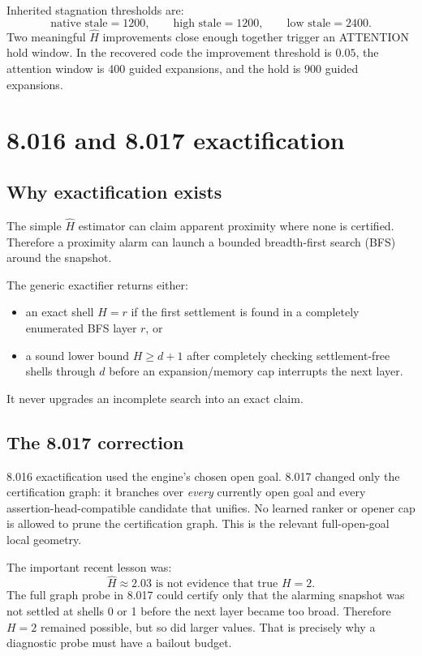 \documentclass[11pt]{article}
\begin{document}
Inherited stagnation thresholds are:
\[
\text{native stale}=1200,\qquad \text{high stale}=1200,\qquad \text{low stale}=2400.
\]
Two meaningful $\widehat H$ improvements close enough together trigger an ATTENTION hold window. In the recovered code the improvement threshold is $0.05$, the attention window is 400 guided expansions, and the hold is 900 guided expansions.

\section{8.016 and 8.017 exactification}

\subsection{Why exactification exists}

The simple $\widehat H$ estimator can claim apparent proximity where none is certified. Therefore a proximity alarm can launch a bounded breadth-first search (BFS) around the snapshot.

The generic exactifier returns either:
\begin{itemize}
\item an exact shell $H=r$ if the first settlement is found in a completely enumerated BFS layer $r$, or
\item a sound lower bound $H\ge d+1$ after completely checking settlement-free shells through $d$ before an expansion/memory cap interrupts the next layer.
\end{itemize}

It never upgrades an incomplete search into an exact claim.

\subsection{The 8.017 correction}

8.016 exactification used the engine's chosen open goal. 8.017 changed only the certification graph: it branches over \emph{every} currently open goal and every assertion-head-compatible candidate that unifies. No learned ranker or opener cap is allowed to prune the certification graph. This is the relevant full-open-goal local geometry.

The important recent lesson was:
\[
\boxed{\widehat H\approx2.03\text{ is not evidence that true }H=2.}
\]
The full graph probe in 8.017 could certify only that the alarming snapshot was not settled at shells 0 or 1 before the next layer became too broad. Therefore $H=2$ remained possible, but so did larger values. That is precisely why a diagnostic probe must have a bailout budget.
\end{document}
